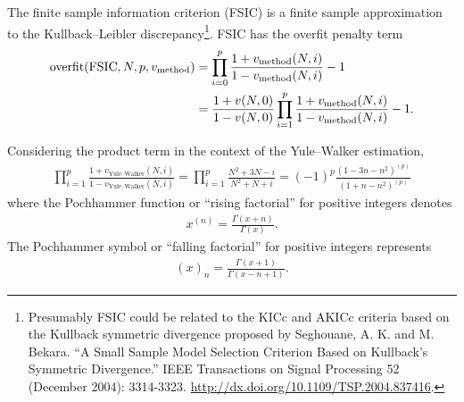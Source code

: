 \documentclass[12pt,letterpaper]{article}
\newcommand{\RisingFactorial}[2]{{#1}^{\left(#2\right)}}
\newcommand{\FallingFactorial}[2]{\left(#1\right)_{#2}}
\begin{document}
The finite sample information criterion (FSIC) is a finite sample approximation
to the Kullback--Leibler discrepancy\footnote{ Presumably FSIC could be related
to the KICc and AKICc criteria based on the Kullback symmetric divergence
proposed by Seghouane, A. K. and M. Bekara.  ``A Small Sample Model Selection
Criterion Based on Kullback's Symmetric Divergence.'' IEEE Transactions on
Signal Processing 52 (December 2004): 3314-3323.
\url{http://dx.doi.org/10.1109/TSP.2004.837416}.}. FSIC has the overfit
penalty term
\begin{align}
    \text{overfit}\!\left(\text{FSIC},N,p,v_\text{method}\right)
    &=
    \prod_{i=0}^{p}
    \frac{
        1 + v_\text{method}\!\left(N,i\right)
    }{
        1 - v_\text{method}\!\left(N,i\right)
    }
    - 1
    \notag
    \\
    &=
    \frac{
        1 + v\!\left(N,0\right)
    }{
        1 - v\!\left(N,0\right)
    }
    \prod_{i=1}^{p}
    \frac{
        1 + v_\text{method}\!\left(N,i\right)
    }{
        1 - v_\text{method}\!\left(N,i\right)
    }
    - 1
    .
\end{align}

Considering the product term in the context of the Yule--Walker estimation,
\begin{align}
    \prod_{i=1}^{p}
    \frac{
        1 + v_\text{Yule--Walker}\!\left(N,i\right)
    }{
        1 - v_\text{Yule--Walker}\!\left(N,i\right)
    }
    =
    \prod_{i=1}^{p}
    \frac{
        N^2 + 3N - i
    }{
        N^2 +  N + i
    }
    =
    \left(-1\right)^p
    \frac{
        \RisingFactorial{\left(1-3n-n^2\right)}{p}
    }{
        \RisingFactorial{\left(1+ n-n^2\right)}{p}
    }
\end{align}
where the Pochhammer function or ``rising factorial'' for positive integers
denotes
\begin{align}
\RisingFactorial{x}{n} = \frac{\Gamma\left(x+n\right)}{\Gamma\left(x\right)}.
\end{align}
The Pochhammer symbol or ``falling factorial'' for positive integers represents
\begin{align}
\FallingFactorial{x}{n} =
\frac{\Gamma\left(x+1\right)}{\Gamma\left(x-n+1\right)}.
\end{align}
\end{document}
